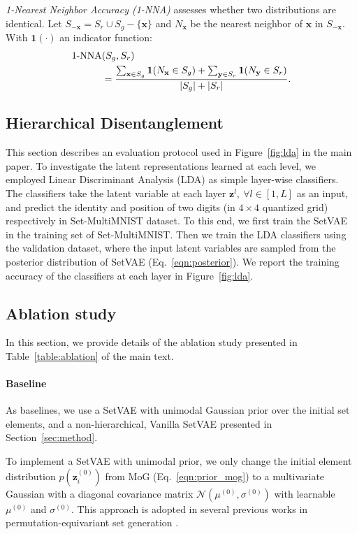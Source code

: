 \documentclass[final]{arxiv/cvpr}
\begin{document}
\emph{1-Nearest Neighbor Accuracy (1-NNA)} assesses whether two distributions are identical.
Let $S_{-\mathbf{x}}=S_r\cup S_g-\{\mathbf{x}\}$ and $N_{\mathbf{x}}$ be the nearest neighbor of $\mathbf{x}$ in $S_{-\mathbf{x}}$. With $\mathbf{1}(\cdot)$ an indicator function:
\begin{align}
    \textnormal{1-NNA}&(S_g, S_r) \nonumber\\
    &= \frac{\sum_{\mathbf{x}\in S_g}\mathbf{1}(N_{\mathbf{x}}\in S_g) + \sum_{\mathbf{y}\in S_r}\mathbf{1}(N_{\mathbf{y}}\in S_r)}{|S_g| + |S_r|}.
\end{align}

\subsection{Hierarchical Disentanglement}
This section describes an evaluation protocol used in Figure~\ref{fig:lda} in the main paper.
To investigate the latent representations learned at each level, we employed Linear Discriminant Analysis (LDA) as simple layer-wise classifiers.
The classifiers take the latent variable at each layer $\mathbf{z}^{l},~\forall l\in[1,L]$ as an input, and predict the identity and position of two digits (in $4\times4$ quantized grid) respectively in Set-MultiMNIST dataset.
To this end, we first train the SetVAE in the training set of Set-MultiMNIST.
Then we train the LDA classifiers using the validation dataset, where the input latent variables are sampled from the posterior distribution of SetVAE (Eq.~\eqref{eqn:posterior}). 
We report the training accuracy of the classifiers at each layer in Figure~\ref{fig:lda}.

\subsection{Ablation study}
In this section, we provide details of the ablation study presented in Table~\ref{table:ablation} of the main text.

\paragraph{Baseline}
As baselines, we use a SetVAE with unimodal Gaussian prior over the initial set elements, and a non-hierarchical, Vanilla SetVAE presented in Section~\ref{sec:method}.

To implement a SetVAE with unimodal prior, we only change the initial element distribution $p(\mathbf{z}_i^{(0)})$ from MoG (Eq.~\eqref{eqn:prior_mog}) to a multivariate Gaussian with a diagonal covariance matrix $\mathcal{N}(\mu^{(0)}, \sigma^{(0)})$ with learnable $\mu^{(0)}$ and $\sigma^{(0)}$.
This approach is adopted in several previous works in permutation-equivariant set generation \cite{yang2019pointflow, kosiorek2020conditional, locatello2020objectcentric}.
\end{document}
